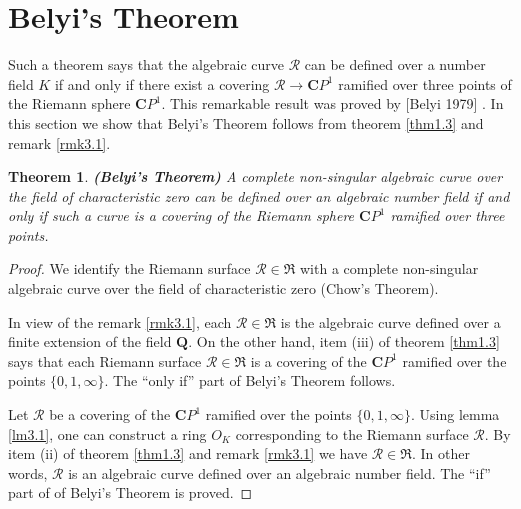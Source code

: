 \documentclass[10pt, reqno]{amsart}
\newtheorem{theorem}{Theorem}[section]
\theoremstyle{definition}
\theoremstyle{remark}
\numberwithin{equation}{section}
\begin{document}
\section{Belyi's Theorem}
Such a theorem says that the algebraic curve $\mathscr{R}$ can be defined over 
a number field $K$ if and only if there exist a covering $\mathscr{R}\to \mathbf{C}P^1$
ramified over three points of  the Riemann sphere 
$\mathbf{C}P^1$.  This remarkable result was proved by [Belyi 1979] \cite[Theorem 4]{Bel1}. 
In this section we show that Belyi's Theorem follows from  theorem \ref{thm1.3} and remark \ref{rmk3.1}. 
\begin{theorem}\label{thm4.1}
\textbf{(Belyi's Theorem)}
A complete non-singular algebraic curve over the field of characteristic
zero can be defined over an algebraic number field if and only if such a curve is a covering
of the Riemann sphere $\mathbf{C}P^1$ ramified over three points. 
\end{theorem}
\begin{proof}
We identify the Riemann surface $\mathscr{R}\in\mathfrak{R}$ with a complete non-singular algebraic 
curve over  the field of characteristic zero (Chow's Theorem). 

\smallskip
In view of the remark \ref{rmk3.1},  each $\mathscr{R}\in\mathfrak{R}$  is the algebraic curve
 defined  over a finite extension of the field $\mathbf{Q}$.  
 On the other hand, item (iii) of theorem \ref{thm1.3}  says  that each  Riemann surface 
$\mathscr{R}\in\mathfrak{R}$ is a covering of the  $\mathbf{C}P^1$ ramified over the points
$\{0,1,\infty\}$.  The ``only if'' part  of Belyi's Theorem follows. 
 
\smallskip 
Let $\mathscr{R}$ be a covering of the  $\mathbf{C}P^1$ ramified over the points
$\{0,1,\infty\}$. Using lemma \ref{lm3.1},  one can construct a ring $O_K$ corresponding
to the Riemann surface $\mathscr{R}$.  By item (ii) of theorem \ref{thm1.3} and remark \ref{rmk3.1} we have
$\mathscr{R}\in\mathfrak{R}$.   In other words,  $\mathscr{R}$ is an algebraic curve defined over an algebraic number field.   
The ``if'' part of of Belyi's Theorem is proved.
 \end{proof}
\end{document}
